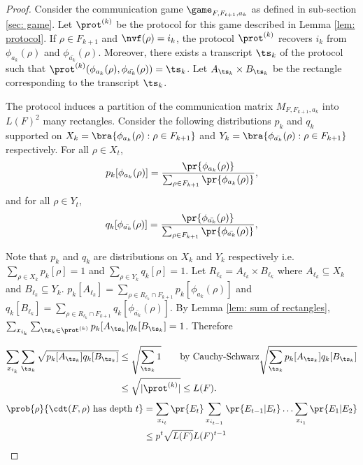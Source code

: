 \begin{proof}
Consider the communication game $\game_{F,F_{t+1},a_k}$ as defined in sub-section \ref{sec: game}.
Let $\prot^{(k)}$ be the protocol for this game described in Lemma \ref{lem: protocol}.
If $\rho \in F_{k+1}$ and $\nvf(\rho) = i_k$, the protocol $\prot^{(k)}$ recovers $i_k$ from $\phi_{a_k}(\rho)$ and $\phi_{\bar{a_k}}(\rho)$. 
Moreover, there exists a transcript $\ts_k$ of the protocol 
such that $\prot^{(k)}(\phi_{a_k}(\rho),\phi_{\bar{a_k}}(\rho)) = \ts_k $. Let $A_{\ts_k} \times B_{\ts_k}$
be the rectangle corresponding to the transcript $\ts_k$. 


The protocol induces a partition of the communication matrix $M_{F,F_{k+1},a_k}$ into $L(F)^2$ many rectangles.
    Consider the following distributions $p_k$ and $q_k$ supported on $X_k = \bra{\phi_{a_k}(\rho):\rho \in F_{k+1}}$ and $Y_k= \bra{\phi_{\bar{a_k}}(\rho): \rho \in F_{k+1}}$ respectively.
    For all $\rho \in X_t$, 
            $$p_k[\phi_{a_k}(\rho)] = \frac{
                                \pr{\phi_{a_k}(\rho)}
                            }
                            {
                            \sum_{\rho \in F_{k+1}}
                                \pr{\phi_{a_k}(\rho)}       
                            },$$
        and for all $\rho \in Y_t$, 
            $$q_k[\phi_{\bar{a_k}}(\rho)] = \frac{
                                \pr{\phi_{\bar{a_k}}(\rho)}
                            }
                            {
                            \sum_{\rho \in F_{k+1}}
                                \pr{\phi_{\bar{a_k}}(\rho)}               
                            },$$

        Note that $p_k$ and $q_k$ are distributions on $X_k$ and $Y_k$ respectively i.e. $\sum_{\rho \in X_k} p_k[\rho] = 1$ and $\sum_{\rho \in Y_k} q_k[\rho] = 1$.
    Let $R_{\ell_k} = A_{\ell_k} \times B_{\ell_k}$ where $A_{\ell_k} \subseteq X_k$ and $B_{\ell_k} \subseteq Y_k$. $p_k[A_{\ell_k}] = \sum_{\rho \in R_{\ell_k} \cap F_{k+1}} p_k[\phi_{a_k}(\rho)] $ and $q_k[B_{\ell_k}] = \sum_{\rho \in R_{\ell_k} \cap F_{k+1}} q_k[\phi_{\bar{a_k}}(\rho)]$. 
    By Lemma \ref{lem: sum of rectangles},
    $\sum_{x_{i_k}}\sum_{\ts_k \in \prot^{(k)}} p_k[A_{\ts_k}]q_k[B_{\ts_k}] = 1$. Therefore

\begin{align*}
    \sum_{x_{i_k}}\sum_{\ts_k} \sqrt{ p_{k}[A_{\ts_k}] q_k
    [B_{\ts_k}] }
        &\leq \sqrt{\sum_{\ts_k} 1} \tag*{by Cauchy-Schwarz} \sqrt{\sum_{\ts_k}p_k[A_{\ts_k}] q_k[B_{\ts_k}]}\\
        &\leq \sqrt{|\prot^{(k)}|} \leq L(F).
\end{align*}
    \begin{align*}
        \prob{\rho}{\cdt(F,\rho) \mathrm{\ has\ depth\ } t} 
            &= \sum_{x_{i_t}} \pr{E_t} \sum_{x_{i_{t-1}}} \pr{E_{t-1}|E_t}\ldots  \sum_{x_{i_1}} \pr{E_1|E_2}\\
            &\leq p^t \sqrt{L(F)} L(F)^{t-1}            
    \end{align*}
\end{proof}



